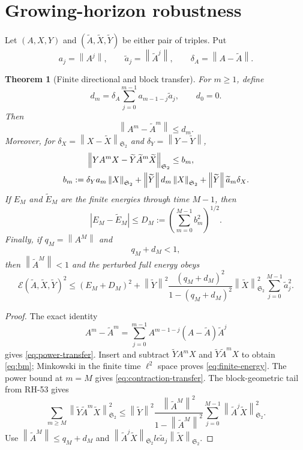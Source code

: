\documentclass[11pt]{article}
\newtheorem{theorem}{Theorem}[section]
\theoremstyle{definition}
\theoremstyle{remark}
\newcommand{\HS}{\mathfrak S_2}
\newcommand{\cE}{\mathcal E}
\newcommand{\norm}[1]{\left\lVert #1\right\rVert}
\begin{document}
\section{Growing-horizon robustness}

Let $(A,X,Y)$ and $(\widetilde A,\widetilde X,\widetilde Y)$ be either pair
of triples.  Put
\[
 a_j=\norm{A^j},
 \qquad
 \widetilde a_j=\norm{\widetilde A^j},
 \qquad
 \delta_A=\norm{A-\widetilde A}.
\]

\begin{theorem}[Finite directional and block transfer]
\label{thm:finite-transfer}
For $m\ge1$, define
\begin{equation}
 d_m=\delta_A\sum_{j=0}^{m-1}
 a_{m-1-j}\widetilde a_j,
 \qquad d_0=0.
 \label{eq:dm}
\end{equation}
Then
\begin{equation}
 \norm{A^m-\widetilde A^m}\le d_m.
 \label{eq:power-transfer}
\end{equation}
Moreover, for
$\delta_X=\norm{X-\widetilde X}_{\HS}$ and
$\delta_Y=\norm{Y-\widetilde Y}$,
\begin{align}
 &\norm{YA^mX-\widetilde Y\widetilde A^m\widetilde X}_{\HS}
 \le b_m,
 \label{eq:bm}\\
 b_m:={}&
 \delta_Ya_m\norm X_{\HS}
 +\norm{\widetilde Y}d_m\norm X_{\HS}
 +\norm{\widetilde Y}\widetilde a_m\delta_X.
 \notag
\end{align}
If $E_M$ and $\widetilde E_M$ are the finite energies through time $M-1$,
then
\begin{equation}
 |E_M-\widetilde E_M|
 \le D_M:=\left(\sum_{m=0}^{M-1}b_m^2\right)^{1/2}.
 \label{eq:finite-energy}
\end{equation}
Finally, if $q_M=\norm{A^M}$ and
\begin{equation}
 \boxed{q_M+d_M<1,}
 \label{eq:contraction-transfer}
\end{equation}
then $\norm{\widetilde A^M}<1$ and the perturbed full energy obeys
\begin{equation}
 \boxed{
 \cE(\widetilde A,\widetilde X,\widetilde Y)^2
 \le(E_M+D_M)^2
 +\norm{\widetilde Y}^2
 \frac{(q_M+d_M)^2}{1-(q_M+d_M)^2}
 \norm{\widetilde X}_{\HS}^2
 \sum_{j=0}^{M-1}\widetilde a_j^2.}
 \label{eq:complete-transfer}
\end{equation}
\end{theorem}

\begin{proof}
The exact identity
\[
 A^m-\widetilde A^m
 =\sum_{j=0}^{m-1}
 A^{m-1-j}(A-\widetilde A)\widetilde A^j
\]
gives \eqref{eq:power-transfer}.  Insert and subtract
$\widetilde YA^mX$ and
$\widetilde Y\widetilde A^mX$ to obtain \eqref{eq:bm}; Minkowski in the
finite time $\ell^2$ space proves \eqref{eq:finite-energy}.  The power bound
at $m=M$ gives \eqref{eq:contraction-transfer}.  The block-geometric tail
from RH-53 gives
\[
 \sum_{m\ge M}
 \norm{\widetilde Y\widetilde A^m\widetilde X}_{\HS}^2
 \le
 \norm{\widetilde Y}^2
 \frac{\norm{\widetilde A^M}^2}
 {1-\norm{\widetilde A^M}^2}
 \sum_{j=0}^{M-1}\norm{\widetilde A^j\widetilde X}_{\HS}^2.
\]
Use $\norm{\widetilde A^M}\le q_M+d_M$ and
$\norm{\widetilde A^j\widetilde X}_{\HS}le
\widetilde a_j\norm{\widetilde X}_{\HS}$.
\end{proof}
\end{document}
